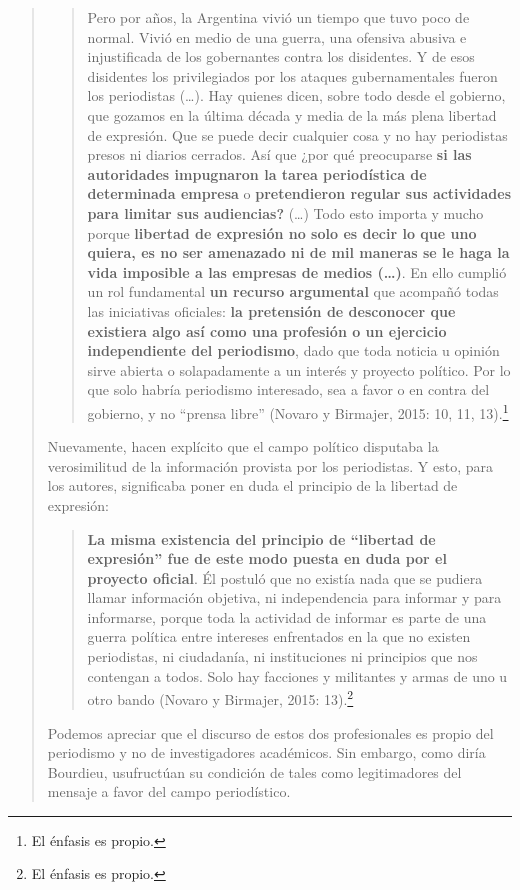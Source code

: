 \begin{quote}
\begin{quote}
	Pero por años, la Argentina vivió un tiempo que tuvo poco de normal. Vivió en medio de una guerra, una ofensiva abusiva e injustificada de los gobernantes contra los disidentes. Y de esos disidentes los privilegiados por los ataques gubernamentales fueron los periodistas (\dots). Hay quienes dicen, sobre todo desde el gobierno, que gozamos en la última década y media de la más plena libertad de expresión. Que se puede decir cualquier cosa y no hay periodistas presos ni diarios cerrados. Así que ¿por qué preocuparse \textbf{si las autoridades impugnaron la tarea periodística de determinada empresa} o \textbf{pretendieron regular sus actividades para limitar sus audiencias?} (\dots) Todo esto importa y mucho porque \textbf{libertad de expresión no solo es decir lo que uno quiera, es no ser amenazado ni de mil maneras se le haga la vida imposible a las empresas de medios (\dots)}. En ello cumplió un rol fundamental \textbf{un recurso argumental} que acompañó todas las iniciativas oficiales: \textbf{la pretensión de desconocer que existiera algo así como una profesión o un ejercicio independiente del periodismo}, dado que toda noticia u opinión sirve abierta o solapadamente a un interés y proyecto político. Por lo que solo habría periodismo interesado, sea a favor o en contra del gobierno, y no \enquote{prensa libre} (Novaro y Birmajer, 2015: 10, 11, 13).\footnote{El énfasis es propio.}
\end{quote}


Nuevamente, hacen explícito que el campo político disputaba la verosimilitud de la información provista por los periodistas. Y esto, para los autores, significaba poner en duda el principio de la libertad de expresión:

\begin{quote}
	\textbf{La misma existencia del principio de \enquote{libertad de expresión} fue de este modo puesta en duda por el proyecto oficial}. Él postuló que no existía nada que se pudiera llamar información objetiva, ni independencia para informar y para informarse, porque toda la actividad de informar es parte de una guerra política entre intereses enfrentados en la que no existen periodistas, ni ciudadanía, ni instituciones ni principios que nos contengan a todos. Solo hay facciones y militantes y armas de uno u otro bando (Novaro y Birmajer, 2015: 13).\footnote{El énfasis es propio.}
\end{quote}


Podemos apreciar que el discurso de estos dos profesionales es propio del periodismo y no de investigadores académicos. Sin embargo, como diría Bourdieu, usufructúan su condición de tales como legitimadores del mensaje a favor del campo periodístico.


\end{quote}
